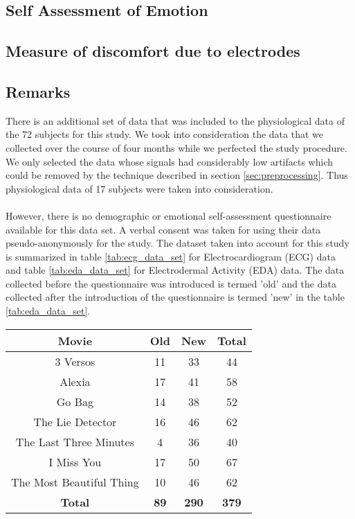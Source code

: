 \subsection{Self Assessment of Emotion}

\subsection{Measure of discomfort due to electrodes}

\subsection{Remarks}
There is an additional set of data that was included to the physiological data of the 72 subjects for this study. We took into consideration the data that we collected over the course of four months while we perfected the study procedure. We only selected the data whose signals had considerably low artifacts which could be removed by the technique described in section \ref{sec:preprocessing}. Thus physiological data of 17 subjects were taken into consideration. 
\paragraph{}However, there is no demographic or emotional self-assessment questionnaire available for this data set. A verbal consent was taken for using their data pseudo-anonymously for the study. The dataset taken into account for this study is summarized in table \ref{tab:ecg_data_set} for Electrocardiogram (ECG) data and table \ref{tab:eda_data_set} for Electrodermal Activity (EDA) data. The data collected before the questionnaire was introduced is termed 'old' and the data collected after the introduction of the questionnaire is termed 'new' in the table \ref{tab:eda_data_set}.


\begin{center}
\begin{tabular}{ |c|c|c|c| }
\hline
Movie & Old & New & Total \\
\hline
\hline
3 Versos & 11 & 33 & 44 \\
\hline
Alexia & 17 & 41 & 58 \\
\hline
Go Bag & 14 & 38 & 52 \\
\hline
The Lie Detector & 16 & 46 & 62 \\
\hline
The Last Three Minutes & 4 & 36 & 40 \\
\hline
I Miss You & 17 & 50 & 67 \\
\hline
The Most Beautiful Thing & 10 & 46 & 62 \\
\hline
\textbf{Total} & \textbf{89} & \textbf{290} & \textbf{379} \\
\hline
\end{tabular}
\label{tab:ecg_data_set}
\end{center}

